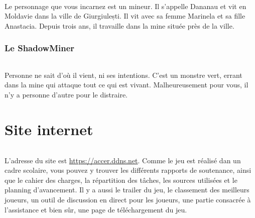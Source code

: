 \documentclass[titlepage, 13px, a4paper]{report}
\begin{document}
\paragraph*{} \hspace{0pt}
Le personnage que vous incarnez est un mineur. Il s'appelle Dananau et vit en Moldavie dans la ville 
de Giurgiulești. Il vit avec sa femme Marinela et sa fille Anastacia. 
Depuis trois ans, il travaille dans la mine située près de la ville. \\

\section{Le ShadowMiner}
\paragraph*{} \hspace{0pt}
Personne ne sait d'où il vient, ni ses intentions. C'est un monstre vert, errant dans la mine qui attaque tout ce qui est vivant. 
Malheureusement pour vous, il n'y a personne d'autre pour le distraire. \\


\newpage


\part{Site internet} 
\paragraph*{} \hspace{0pt}
L'adresse du site est \url{https://accer.ddns.net}. Comme le jeu est réalisé dan un cadre scolaire, 
vous pouvez y trouver les différents rapports de soutenance, ainsi que le cahier des charges, la 
répartition des tâches, les sources utilisées et le planning d'avancement. Il y a aussi le trailer 
du jeu, le classement des meilleurs joueurs, un outil de discussion en direct pour les joueurs,  
une partie consacrée à l'assistance et bien sûr, une page de téléchargement du jeu. \\


\newpage

\end{document}
